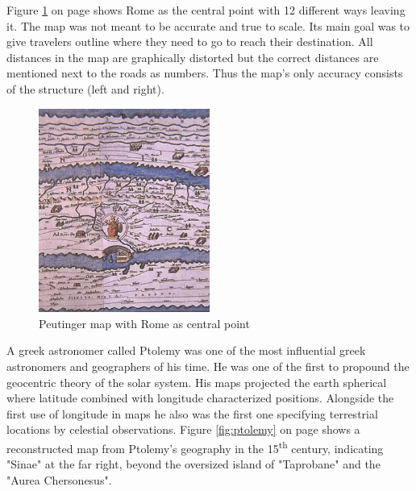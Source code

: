 Figure \ref{fig:peutinger-rome} on page \pageref{fig:peutinger-rome} shows Rome as the central point with 12 different ways leaving it. The map was not meant to be accurate and true to scale. Its main goal was to give travelers outline where they need to go to reach their destination. All distances in the map are graphically distorted but the correct distances are mentioned next to the roads as numbers. Thus the map's only accuracy consists of the structure (left and right).

\begin{figure}[!htb]
\centering
\includegraphics[width=0.5\textwidth,keepaspectratio]{images/history/peutinger_rom.jpg}
\caption[
    Peutinger map with Rome as central point, Urldate: 07.2016 \newline
\small\texttt{\url{https://web.archive.org/web/20060106224928/http://www.kargi.de/Geschichte/Peutinger/peutinger_rom.jpg}}
]{Peutinger map with Rome as central point}
\label{fig:peutinger-rome}
\end{figure}

A greek astronomer called Ptolemy was one of the most influential greek astronomers and geographers of his time. He was one of the first to propound the geocentric theory of the solar system. His maps projected the earth spherical where latitude combined with longitude characterized positions. Alongside the first use of longitude in maps he also was the first one specifying terrestrial locations by celestial observations. Figure \ref{fig:ptolemy} on page \pageref{fig:ptolemy} shows a reconstructed map from Ptolemy's geography in the 15\textsuperscript{th} century, indicating "Sinae" at the far right, beyond the oversized island of "Taprobane" and the "Aurea Chersonesus".

